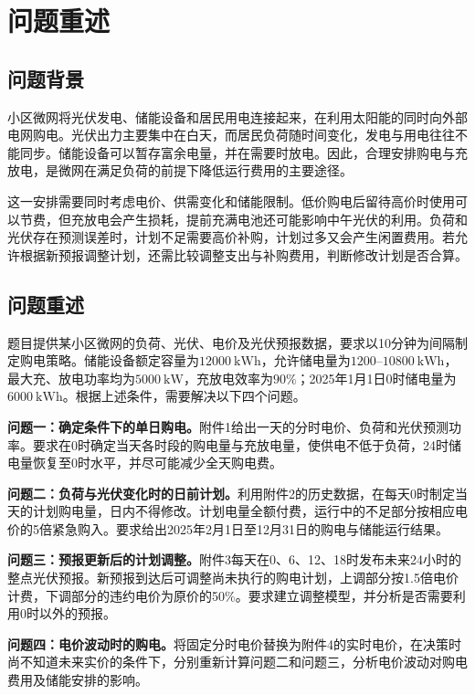 \section{问题重述}

\subsection{问题背景}

小区微网将光伏发电、储能设备和居民用电连接起来，在利用太阳能的同时向外部电网购电。光伏出力主要集中在白天，而居民负荷随时间变化，发电与用电往往不能同步。储能设备可以暂存富余电量，并在需要时放电。因此，合理安排购电与充放电，是微网在满足负荷的前提下降低运行费用的主要途径。

这一安排需要同时考虑电价、供需变化和储能限制。低价购电后留待高价时使用可以节费，但充放电会产生损耗，提前充满电池还可能影响中午光伏的利用。负荷和光伏存在预测误差时，计划不足需要高价补购，计划过多又会产生闲置费用。若允许根据新预报调整计划，还需比较调整支出与补购费用，判断修改计划是否合算。

\subsection{问题重述}

题目提供某小区微网的负荷、光伏、电价及光伏预报数据，要求以10分钟为间隔制定购电策略。储能设备额定容量为$12000\ \mathrm{kWh}$，允许储电量为$1200$--$10800\ \mathrm{kWh}$，最大充、放电功率均为$5000\ \mathrm{kW}$，充放电效率为$90\%$；2025年1月1日0时储电量为$6000\ \mathrm{kWh}$。根据上述条件，需要解决以下四个问题\cite{problem-c}。

\textbf{问题一：确定条件下的单日购电。}附件1给出一天的分时电价、负荷和光伏预测功率。要求在0时确定当天各时段的购电量与充放电量，使供电不低于负荷，24时储电量恢复至0时水平，并尽可能减少全天购电费。

\textbf{问题二：负荷与光伏变化时的日前计划。}利用附件2的历史数据，在每天0时制定当天的计划购电量，日内不得修改。计划电量全额付费，运行中的不足部分按相应电价的5倍紧急购入。要求给出2025年2月1日至12月31日的购电与储能运行结果。

\textbf{问题三：预报更新后的计划调整。}附件3每天在0、6、12、18时发布未来24小时的整点光伏预报。新预报到达后可调整尚未执行的购电计划，上调部分按1.5倍电价计费，下调部分的违约电价为原价的50\%。要求建立调整模型，并分析是否需要利用0时以外的预报。

\textbf{问题四：电价波动时的购电。}将固定分时电价替换为附件4的实时电价，在决策时尚不知道未来实价的条件下，分别重新计算问题二和问题三，分析电价波动对购电费用及储能安排的影响。

